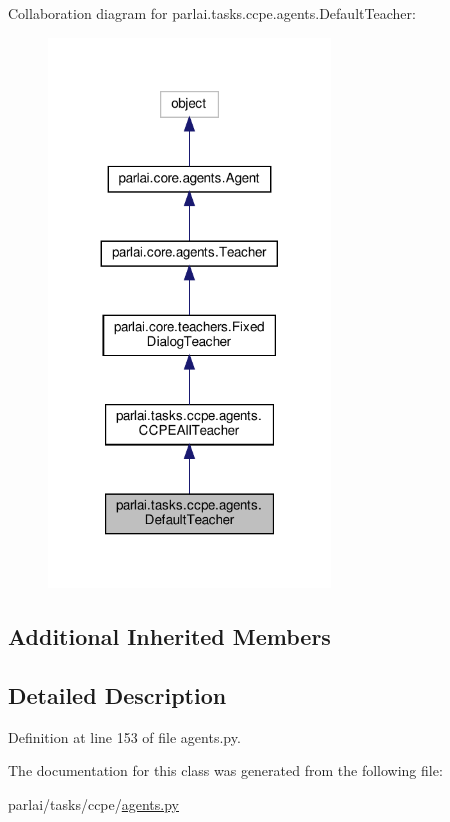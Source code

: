 Collaboration diagram for parlai.\+tasks.\+ccpe.\+agents.\+Default\+Teacher\+:
\nopagebreak
\begin{figure}[H]
\begin{center}
\leavevmode
\includegraphics[width=212pt]{da/ddf/classparlai_1_1tasks_1_1ccpe_1_1agents_1_1DefaultTeacher__coll__graph}
\end{center}
\end{figure}
\subsection*{Additional Inherited Members}


\subsection{Detailed Description}


Definition at line 153 of file agents.\+py.



The documentation for this class was generated from the following file\+:\begin{DoxyCompactItemize}
\item 
parlai/tasks/ccpe/\hyperlink{parlai_2tasks_2ccpe_2agents_8py}{agents.\+py}\end{DoxyCompactItemize}

